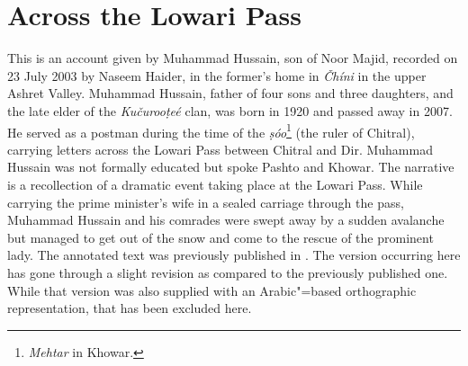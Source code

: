 \appendix
{}

\section*{Across the Lowari Pass}

This is an account given by Muhammad Hussain, son of Noor Majid, recorded on 23 July 2003 by Naseem Haider, in the former’s home in \textit{Čhíni} in the upper Ashret Valley. Muhammad Hussain, father of four sons and three daughters, and the late elder of the \textit{Kučurooṭeé} clan, was born in 1920 and passed away in 2007. He served as a postman during the time of the \textit{ṣóo}\footnote{\textit{Mehtar} in Khowar.} (the ruler of Chitral), carrying letters across the Lowari Pass between Chitral and Dir. Muhammad Hussain was not formally educated but spoke Pashto and Khowar. The narrative is a recollection of a dramatic event taking place at the Lowari Pass. While carrying the prime minister’s wife in a sealed carriage through the pass, Muhammad Hussain and his comrades were swept away by a sudden avalanche but managed to get out of the snow and come to the rescue of the prominent lady. The annotated text was previously published in \citet[131--137]{liljegrenhaider2015}. The version occurring here has gone through a slight revision as compared to the previously published one. While that version was also supplied with an Arabic"=based orthographic representation, that has been excluded here.


